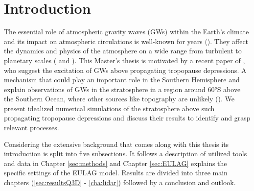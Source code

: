 \chapter{Introduction}
\label{sec:intro} 

The essential role of atmospheric gravity waves (GWs) within the Earth's climate and its impact on atmospheric circulations is well-known for years (\cite{fritts_gravity_2003}). They affect the dynamics and physics of the atmosphere on a wide range from turbulent to planetary scales (\cite{plougonven_how_2020} and \cite{williams_census_2017}). This Master's thesis is motivated by a recent paper of \textcite{dornbrack_stratospheric_2022}, who suggest the excitation of GWs above propagating tropopause depressions. A mechanism that could play an important role in the Southern Hemisphere and explain observations of GWs in the stratosphere in a region around 60°S above the Southern Ocean, where other sources like topography are unlikely (\cite{hindley_18year_2020}). We present idealized numerical simulations of the stratosphere above such propagating tropopause depressions and discuss their results to identify and grasp relevant processes. 

Considering the extensive background that comes along with this thesis its introduction is split into five subsections. It follows a description of utilized tools and data in Chapter \ref{sec:methods} and Chapter \ref{sec:EULAG} explains the specific settings of the EULAG model. Results are divided into three main chapters (\ref{sec:resultsQ3D} - \ref{cha:lidar}) followed by a conclusion and outlook.

%

